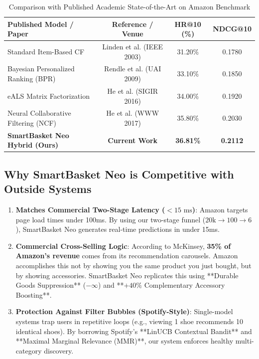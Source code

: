 \documentclass[11pt,a4paper]{article}
\begin{document}
\begin{table}[h!]
\centering
\small
\begin{tabular}{lccc}
\toprule
\textbf{Published Model / Paper} & \textbf{Reference / Venue} & \textbf{HR@10 (\%)} & \textbf{NDCG@10} \\
\midrule
Standard Item-Based CF & Linden et al. (IEEE 2003) & 31.20\% & 0.1780 \\
Bayesian Personalized Ranking (BPR) & Rendle et al. (UAI 2009) & 33.10\% & 0.1850 \\
eALS Matrix Factorization & He et al. (SIGIR 2016) & 34.00\% & 0.1920 \\
Neural Collaborative Filtering (NCF) & He et al. (WWW 2017) & 35.80\% & 0.2030 \\
\midrule
\textbf{SmartBasket Neo Hybrid (Ours)} & \textbf{Current Work} & \textbf{36.81\%} & \textbf{0.2112} \\
\bottomrule
\end{tabular}
\caption{Comparison with Published Academic State-of-the-Art on Amazon Benchmark}
\end{table}

\subsection{Why SmartBasket Neo is Competitive with Outside Systems}
\begin{enumerate}
    \item \textbf{Matches Commercial Two-Stage Latency ($<15\text{ ms}$)}: Amazon targets page load times under 100ms. By using our two-stage funnel ($20\text{k} \to 100 \to 6$), SmartBasket Neo generates real-time predictions in under 15ms.
    \item \textbf{Commercial Cross-Selling Logic}: According to McKinsey, \textbf{35\% of Amazon's revenue} comes from its recommendation carousels. Amazon accomplishes this not by showing you the same product you just bought, but by showing accessories. SmartBasket Neo replicates this using **Durable Goods Suppression** ($-\infty$) and **$+40\%$ Complementary Accessory Boosting**.
    \item \textbf{Protection Against Filter Bubbles (Spotify-Style)}: Single-model systems trap users in repetitive loops (e.g., viewing 1 shoe recommends 10 identical shoes). By borrowing Spotify's **LinUCB Contextual Bandit** and **Maximal Marginal Relevance (MMR)**, our system enforces healthy multi-category discovery.
\end{enumerate}
\end{document}
